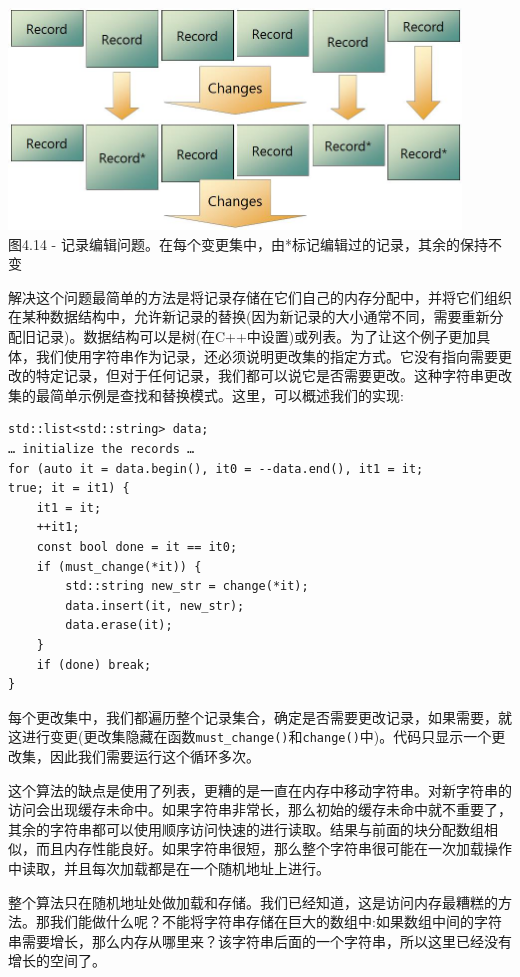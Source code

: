 \begin{center}
\includegraphics[width=0.9\textwidth]{content/1/chapter4/images/14.jpg}\\
图4.14 - 记录编辑问题。在每个变更集中，由*标记编辑过的记录，其余的保持不变
\end{center}

解决这个问题最简单的方法是将记录存储在它们自己的内存分配中，并将它们组织在某种数据结构中，允许新记录的替换(因为新记录的大小通常不同，需要重新分配旧记录)。数据结构可以是树(在C++中设置)或列表。为了让这个例子更加具体，我们使用字符串作为记录，还必须说明更改集的指定方式。它没有指向需要更改的特定记录，但对于任何记录，我们都可以说它是否需要更改。这种字符串更改集的最简单示例是查找和替换模式。这里，可以概述我们的实现:

\begin{lstlisting}[style=styleCXX]
std::list<std::string> data;
… initialize the records …
for (auto it = data.begin(), it0 = --data.end(), it1 = it;
true; it = it1) {
	it1 = it;
	++it1;
	const bool done = it == it0;
	if (must_change(*it)) {
		std::string new_str = change(*it);
		data.insert(it, new_str);
		data.erase(it);
	}
	if (done) break;
}
\end{lstlisting}

每个更改集中，我们都遍历整个记录集合，确定是否需要更改记录，如果需要，就这进行变更(更改集隐藏在函数\texttt{must\_change()}和\texttt{change()}中)。代码只显示一个更改集，因此我们需要运行这个循环多次。

这个算法的缺点是使用了列表，更糟的是一直在内存中移动字符串。对新字符串的访问会出现缓存未命中。如果字符串非常长，那么初始的缓存未命中就不重要了，其余的字符串都可以使用顺序访问快速的进行读取。结果与前面的块分配数组相似，而且内存性能良好。如果字符串很短，那么整个字符串很可能在一次加载操作中读取，并且每次加载都是在一个随机地址上进行。

整个算法只在随机地址处做加载和存储。我们已经知道，这是访问内存最糟糕的方法。那我们能做什么呢？不能将字符串存储在巨大的数组中:如果数组中间的字符串需要增长，那么内存从哪里来？该字符串后面的一个字符串，所以这里已经没有增长的空间了。

